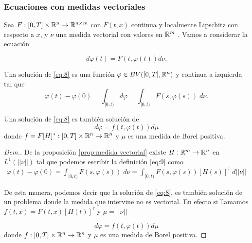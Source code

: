 	
\subsubsection{Ecuaciones con medidas vectoriales}

Sea $F:[0,T]\times\mathbb{R}^n\to \mathbb{R}^{n\times m}$ con $F(t,x)$  continua y  localmente Lipschitz con respecto a $x$, y $\nu$ una medida vectorial con valores en   $\mathbb{R}^m$ .
Vamos a considerar la ecuación 

\begin{equation}\label{eq:8}
d\varphi(t)=F(t,\varphi(t))d\nu . 
\end{equation}
\begin{defi}
	Una solución de \eqref{eq:8} es una función $\varphi\in BV([0,T],\mathbb{R}^n)$ y continua a izquierda tal que  
\begin{equation}\label{eq:9}
    \varphi(t)-\varphi(0)=\int_{[0,t)}d\varphi=\int_{[0,t)}F(s,\varphi(s))\; d\nu.
\end{equation}
\end{defi}

\begin{thm}\label{thm:m_equivalente}
Una solución de \eqref{eq:8} es también solución de    
\begin{equation}\label{eq:10}
	d\varphi=f(t,\varphi(t))d\mu
\end{equation} 
donde $f=F[H]^*:[0,T]\times\mathbb{R}^n\to \mathbb{R}^n$ y  $\mu$ es una medida de Borel positiva. 
\end{thm}
\begin{proof}[Dem.]
    De la proposición \eqref{prop:medida vectorial} existe $H:\mathbb{R}^m\to\mathbb{R}^n$ en  $L^1(||\nu||)$ tal que  podemos escribir la definición \eqref{eq:9} como 
    \begin{equation*}
        \begin{split}
           \varphi(t)-\varphi(0)=\int_{[0,t)}F(s,\varphi(s))\; d\nu=\int_{[0,t)}F(s,\varphi(s))[H(s)]^\tau\; d||\nu||
        \end{split}
    \end{equation*}



De esta manera, podemos decir que la solución de \ref{eq:8}, es también solución de un problema donde la medida que intervine no es vectorial. En efecto si llamamos $f(t,x)=F(t,x)[H(t)]^\tau$ y $\mu=||\nu||$

\begin{equation*}
	d\varphi=f(t,\varphi(t))d\mu
\end{equation*} 
donde $f:[0,T]\times\mathbb{R}^n\to \mathbb{R}^n$ y  $\mu$ es una medida de Borel positiva.
\end{proof}


